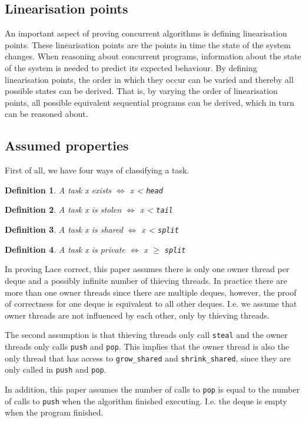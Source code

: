 \documentclass{sig-alternate-br}
\newtheorem{definition}{Definition}
\begin{document}
\subsection{Linearisation points}
\label{sec:lin}
An important aspect of proving concurrent algorithms is defining linearisation points\cite{herlihy1990}.
These linearisation points are the points in time the state of the system changes.
When reasoning about concurrent programs, information about the state of the system is needed to predict its expected behaviour.
By defining linearisation points, the order in which they occur can be varied and thereby all possible states can be derived.
That is, by varying the order of linearisation points, all possible equivalent sequential programs can be derived, which in turn can be reasoned about.

\subsection{Assumed properties}
First of all, we have four ways of classifying a task.
\begin{definition}A task x exists $\iff$ x < \texttt{head}\end{definition}
\begin{definition}A task x is stolen $\iff$ x < \texttt{tail}\end{definition}
\begin{definition}A task x is shared $\iff$ x < \texttt{split}\end{definition}
\begin{definition}A task x is private $\iff$ x $\geq$ \texttt{split}\end{definition}
In proving Lace correct, this paper assumes there is only one owner thread per deque and a possibly infinite number of thieving threads.
In practice there are more than one owner threads since there are multiple deques, however, the proof of correctness for one deque is equivalent to all other deques.
I.e. we assume that owner threads are not influenced by each other, only by thieving threads.

The second assumption is that thieving threads only call \texttt{steal} and the owner threads only calls \texttt{push}  and \texttt{pop}.
This implies that the owner thread is also the only thread that has access to \texttt{grow\_shared}  and \texttt{shrink\_shared}, since they are only called in \texttt{push} and \texttt{pop}.

In addition, this paper assumes the number of calls to \texttt{pop} is equal to the number of calls to \texttt{push} when the algorithm finished executing. I.e. the deque is empty when the program finished.
\end{document}
